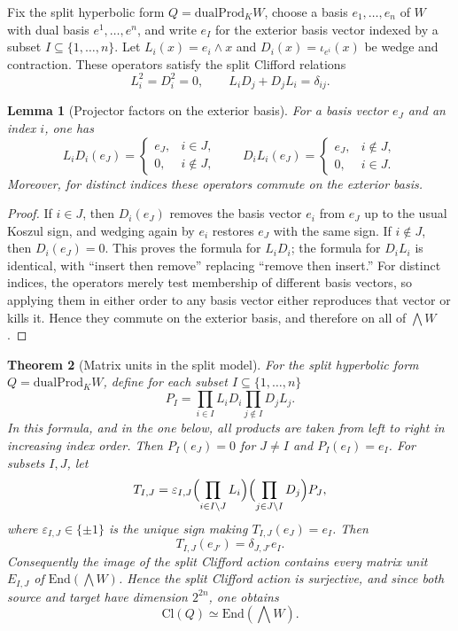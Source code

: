 \documentclass[11pt,a4paper]{article}
\theoremstyle{plain}
\newtheorem{theorem}{Theorem}[section]
\newtheorem{lemma}[theorem]{Lemma}
\theoremstyle{definition}
\theoremstyle{remark}
\newcommand{\Cl}{\mathrm{Cl}}
\newcommand{\End}{\mathrm{End}}
\newcommand{\dualProd}{\mathrm{dualProd}}
\begin{document}
Fix the split hyperbolic form $Q=\dualProd_K W$, choose a basis
$e_1,\dots,e_n$ of $W$ with dual basis $e^1,\dots,e^n$, and write
$e_I$ for the exterior basis vector indexed by a subset
$I\subseteq \{1,\dots,n\}$. Let $L_i(x)=e_i\wedge x$ and
$D_i(x)=\iota_{e^i}(x)$ be wedge and contraction. These operators satisfy the
split Clifford relations
\[
  L_i^2=D_i^2=0,
  \qquad
  L_iD_j+D_jL_i=\delta_{ij}.
\]

\begin{lemma}[Projector factors on the exterior basis]
For a basis vector $e_J$ and an index $i$, one has
\[
  L_iD_i(e_J)=
  \begin{cases}
    e_J,& i\in J,\\
    0,& i\notin J,
  \end{cases}
  \qquad
  D_iL_i(e_J)=
  \begin{cases}
    e_J,& i\notin J,\\
    0,& i\in J.
  \end{cases}
\]
Moreover, for distinct indices these operators commute on the exterior basis.
\end{lemma}

\begin{proof}
If $i\in J$, then $D_i(e_J)$ removes the basis vector $e_i$ from $e_J$ up to
the usual Koszul sign, and wedging again by $e_i$ restores $e_J$ with the same
sign. If $i\notin J$, then $D_i(e_J)=0$. This proves the formula for $L_iD_i$;
the formula for $D_iL_i$ is identical, with ``insert then remove'' replacing
``remove then insert.'' For distinct indices, the operators merely test
membership of different basis vectors, so applying them in either order to any
basis vector either reproduces that vector or kills it. Hence they commute on
the exterior basis, and therefore on all of $\bigwedge W$.
\end{proof}

\begin{theorem}[Matrix units in the split model]
\label{thm:matrix-units-split}
For the split hyperbolic form $Q=\dualProd_K W$, define for each subset
$I\subseteq \{1,\dots,n\}$
\[
  P_I=\prod_{i\in I} L_iD_i \prod_{j\notin I} D_jL_j .
\]
In this formula, and in the one below, all products are taken from left to
right in increasing index order. Then $P_I(e_J)=0$ for $J\neq I$ and
$P_I(e_I)=e_I$. For subsets $I,J$, let
\[
  T_{I,J}=
    \varepsilon_{I,J}
    \Bigl(\prod_{i\in I\setminus J} L_i\Bigr)
    \Bigl(\prod_{j\in J\setminus I} D_j\Bigr)
    P_J,
\]
where $\varepsilon_{I,J}\in\{\pm 1\}$ is the unique sign making
$T_{I,J}(e_J)=e_I$. Then
\[
  T_{I,J}(e_{J'})=\delta_{J,J'} e_I.
\]
Consequently the image of the split Clifford action contains every matrix unit
$E_{I,J}$ of $\End(\bigwedge W)$. Hence the split Clifford action is
surjective, and since both source and target have dimension $2^{2n}$, one obtains
\[
  \Cl(Q)\simeq \End(\bigwedge W).
\]
\end{theorem}
\end{document}
